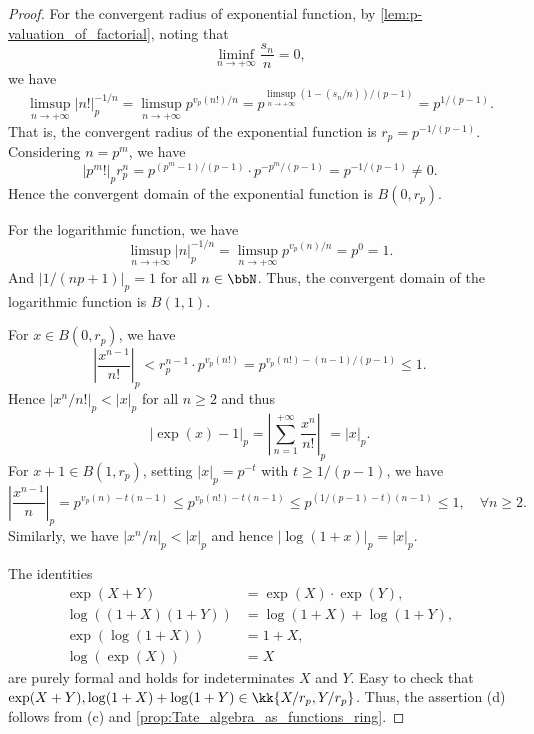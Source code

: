     \begin{proof}
        For the convergent radius of exponential function, 
        by \cref{lem:p-valuation_of_factorial}, 
        noting that 
        \[\liminf_{n \to +\infty} \frac{s_n}{n} = 0,\]
        we have
        \[ \limsup_{n \to +\infty} |n!|_p^{-1/n} = \limsup_{n \to +\infty} p^{v_p(n!)/n} = p^{\limsup_{n \to +\infty} (1-(s_n/n))/(p-1)} = p^{1/(p-1)}. \]
        That is, the convergent radius of the exponential function is \(r_p = p^{-1/(p-1)}\).
        Considering \(n = p^m\), we have
        \[ |p^m!|_p r_p^n = p^{(p^m - 1)/(p-1)} \cdot p^{-p^m/(p-1)} = p^{-1/(p-1)} \neq 0.\]
        Hence the convergent domain of the exponential function is \(B(0, r_p)\).

        For the logarithmic function, we have
        \[ \limsup_{n \to +\infty} |n|_p^{-1/n} = \limsup_{n \to +\infty} p^{v_p(n)/n} = p^0 = 1. \]
        And \(|1/(np+1)|_p = 1\) for all \(n \in \bbN\).
        Thus, the convergent domain of the logarithmic function is \(B(1, 1)\).

        For \(x \in B(0,r_p)\), we have
        \[ \left|\frac{x^{n-1}}{n!}\right|_p < r_p^{n-1} \cdot p^{v_p(n!)} = p^{v_p(n!)-(n-1)/(p-1)} \leq 1.\]
        Hence \(|x^n/n!|_p < |x|_p\) for all \(n \geq 2\) and thus
        \[ |\exp(x) - 1|_p = \left| \sum_{n=1}^{+\infty} \frac{x^n}{n!} \right|_p = |x|_p. \]
        For \(x+1 \in B(1,r_p)\), setting \(|x|_p = p^{-t}\) with \(t \geq 1/(p-1)\), we have
        \[ \left|\frac{x^{n-1}}{n}\right|_p = p^{v_p(n)-t(n-1)} \leq p^{v_p(n!) - t(n-1)} \leq p^{(1/(p-1)-t)(n-1)} \leq 1, \quad \forall n \geq 2. \]
        Similarly, we have \(|x^{n}/n|_p < |x|_p\) and hence \(|\log(1+x)|_p = |x|_p\).
        
        The identities
        \begin{align*}
            \exp(X+Y) &= \exp(X) \cdot \exp(Y), \\
            \log((1+X)(1+Y)) &= \log(1+X) + \log(1+Y),\\
            \exp(\log(1+X)) &= 1 + X, \\
            \log(\exp(X)) &= X
        \end{align*}
        are purely formal and holds for indeterminates \(X\) and \(Y\).
        Easy to check that \(\exp(X+Y), \log(1+X)+\log(1+Y) \in \kk\{X/r_p,Y/r_p\}\).
        Thus, the assertion (d) follows from (c) and \cref{prop:Tate_algebra_as_functions_ring}.
    \end{proof}


